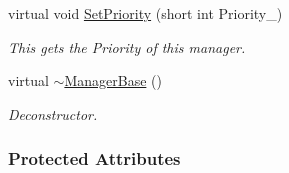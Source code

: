 \begin{DoxyCompactItemize}
virtual void \hyperlink{classMezzanine_1_1ManagerBase_ac71cd03e0a60427a1ee22637a3cc1b3e}{SetPriority} (short int Priority\_\-)
\begin{DoxyCompactList}\small\item\em This gets the Priority of this manager. \item\end{DoxyCompactList}\item 
virtual \hyperlink{classMezzanine_1_1ManagerBase_a04cb832dc79f4559cc5b2f57cabfa70d}{$\sim$ManagerBase} ()
\begin{DoxyCompactList}\small\item\em Deconstructor. \item\end{DoxyCompactList}\end{DoxyCompactItemize}
\subsubsection*{Protected Attributes}
